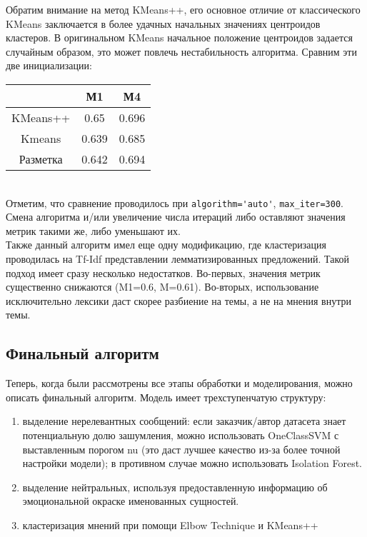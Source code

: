 \documentclass{article}
\begin{document}
Обратим внимание на метод KMeans++, его основное отличие от классического KMeans заключается в более удачных начальных значениях центроидов кластеров. В оригинальном KMeans начальное положение центроидов задается случайным образом, это может повлечь нестабильность алгоритма. Сравним эти две инициализации:
\begin{table}[!htb]
\center
    \begin{tabular}{|c|c|c|}
    \hline
             & М1    & М4    \\ \hline
    KMeans++ & 0.65  & 0.696 \\ \hline
    Kmeans   & 0.639 & 0.685 \\ \hline
    Разметка & 0.642 & 0.694 \\ \hline
    \end{tabular}
\end{table}\\
Отметим, что сравнение проводилось при \verb|algorithm='auto'|, \verb|max_iter=300|. Смена алгоритма и/или увеличение числа итераций либо оставляют значения метрик такими же, либо уменьшают их.\\

Также данный алгоритм имел еще одну модификацию, где кластеризация проводилась на Tf-Idf представлении лемматизированных предложений. Такой подход имеет сразу несколько недостатков. Во-первых, значения метрик существенно снижаются (M1=0.6, M=0.61). Во-вторых, использование исключительно лексики даст скорее разбиение на темы, а не на мнения внутри темы.

\subsection{Финальный алгоритм}
Теперь, когда были рассмотрены все этапы обработки и моделирования, можно описать финальный алгоритм. Модель имеет трехступенчатую структуру:
\begin{enumerate}
    \item выделение нерелевантных сообщений: если заказчик/автор датасета знает потенциальную долю зашумления, можно использовать OneClassSVM с выставленным порогом nu (это даст лучшее качество из-за более точной настройки модели); в противном случае можно использовать Isolation Forest.
     \item выделение нейтральных, используя предоставленную информацию об эмоциональной окраске именованных сущностей.
     \item кластеризация мнений при помощи Elbow Technique и KMeans++
\end{enumerate}
\end{document}

